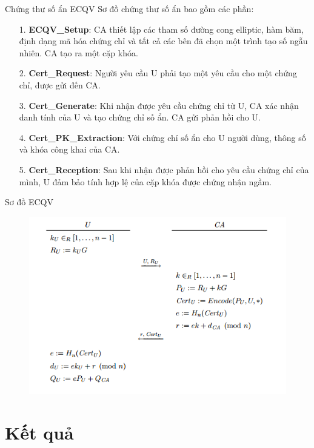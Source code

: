 \documentclass[compress]{beamer}
\begin{document}
\begin{frame}{Chứng thư số ẩn ECQV}
Sơ đồ chứng thư số ẩn bao gồm các phần:
\small{
\begin{itemize}
\item[1. ] \textbf{ECQV\_Setup}: CA thiết lập các tham số đường cong elliptic, hàm băm, định dạng mã hóa chứng chỉ và tất cả các bên đã chọn một trình tạo số ngẫu nhiên. CA tạo ra một cặp khóa.
\item[2. ] \textbf{Cert\_Request}: Người yêu cầu U phải tạo một yêu cầu cho một chứng chỉ, được gửi đến CA.
\item[3. ] \textbf{Cert\_Generate}: Khi nhận được yêu cầu chứng chỉ từ U, CA xác nhận danh tính của U và tạo chứng chỉ số ẩn. CA gửi phản hồi cho U.
\item[4. ] \textbf{Cert\_PK\_Extraction}: Với chứng chỉ số ẩn cho U người dùng, thông số và khóa công khai của CA.
\item[5. ] \textbf{Cert\_Reception}: Sau khi nhận được phản hồi cho yêu cầu chứng chỉ của mình, U đảm bảo tính hợp lệ của cặp khóa được chứng nhận ngầm.
\end{itemize}
}
\end{frame}
\begin{frame}{Sơ đồ ECQV}
\begin{center}
\begin{figure}[h]
\centering
\includegraphics[width=0.85\linewidth]{../im8.png}
\end{figure}
\end{center}
\end{frame}
\section{Kết quả}
\end{document}

